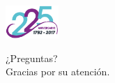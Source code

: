 
\begin{frame}
  \centering
  \includegraphics[width=0.15\textwidth]{img/ullesc.eps}
    \begin{center}
     \Huge{¿Preguntas?} \\
     Gracias por su atención.
    \end{center}
\end{frame}